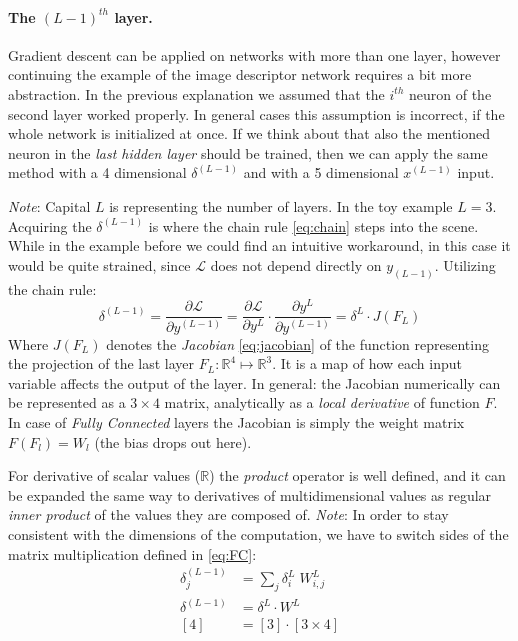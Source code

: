 \paragraph{The $(L-1)^{th}$ layer.} Gradient descent can be applied on networks with more than one layer, 
however continuing the example of the image descriptor network requires a bit more abstraction. 
In the previous explanation we assumed that the $i^{th}$ neuron of the second layer worked properly.
In general cases this assumption is incorrect, if the whole network is initialized at once.
If we think about that also the mentioned neuron in the \emph{last hidden layer} should be trained, 
then we can apply the same method with a 4 dimensional $\delta^{(L-1)}$ and with a 5 dimensional $x^{(L-1)}$ input.

\emph{Note}: Capital $L$ is representing the number of layers. In the toy example $L = 3$.\\
Acquiring the $\delta^{(L-1)}$ is where the chain rule \eqref{eq:chain} steps into the scene.
While in the example before we could find an intuitive workaround, in this case it would be quite strained, since $\mathcal{L}$ does not depend directly on $y_{(L-1)}$.
Utilizing the chain rule:
\begin{equation}\label{eq:backward}
    \delta^{(L-1)} = 
    \frac{\partial \mathcal{L}}{\partial y^{(L-1)}} = 
    \frac{\partial \mathcal{L}}{\partial y^{L}} \cdot
    \frac{\partial y^{L}}{\partial y^{(L-1)}} = 
    \delta^L \cdot J(F_L)
\end{equation}
Where $J(F_L)$ denotes the \emph{Jacobian} \eqref{eq:jacobian} of the function representing the projection of the last layer $F_L:\mathbb{R}^4\mapsto \mathbb{R}^3$.
It is a map of how each input variable affects the output of the layer.
In general: the Jacobian numerically can be represented as a $3 \times 4$ matrix, analytically as a \emph{local derivative} of function $F$.
In case of \emph{Fully Connected} layers the Jacobian is simply the weight matrix $F(F_l)=W_l$ (the bias drops out here).

For derivative of scalar values ($\mathbb{R}$) the \emph{product} operator is well defined, 
and it can be expanded the same way to derivatives of multidimensional values as 
regular \emph{inner product} of the values they are composed of.
\emph{Note}: In order to stay consistent with the dimensions of the computation, we have to switch sides of the matrix multiplication defined in \eqref{eq:FC}:
\begin{equation}\label{eq:reverse}
\begin{split}
\delta^{(L-1)}_j &= 
    \sum_j \delta^L_i \; W^L_{i,j} \\
    \delta^{(L-1)} &= \delta^L \cdot W^L\\
    \left[4\right] &= \left[3\right] \cdot \left[3 \times 4\right] 
\end{split}
\end{equation}
